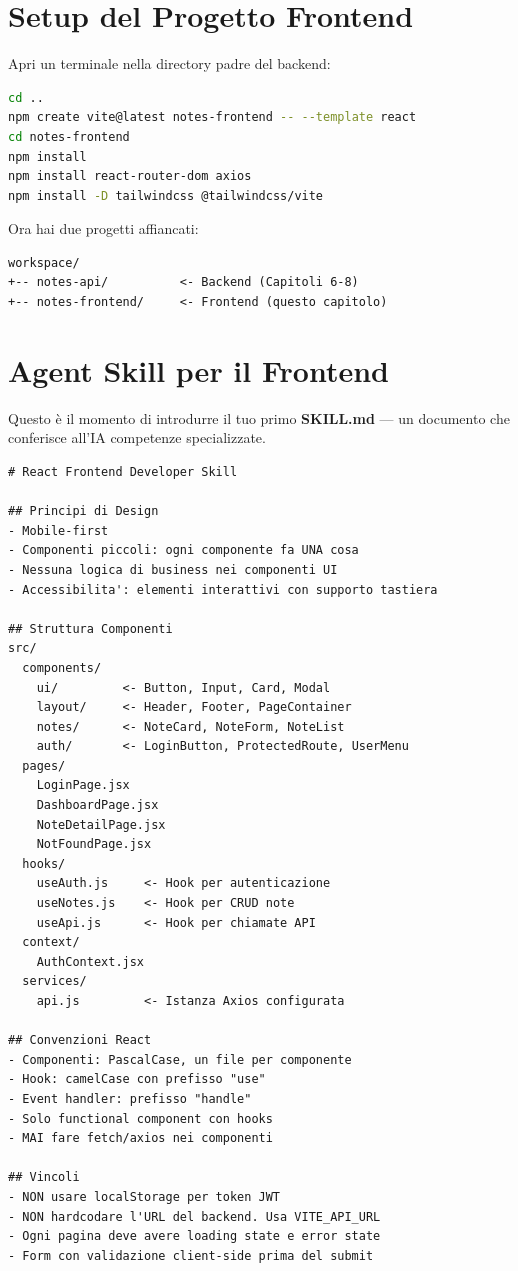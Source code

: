 \section{Setup del Progetto Frontend}

\begin{praticabox}[title={Pratica --- Creare il progetto React}]
Apri un terminale nella directory padre del backend:
\begin{lstlisting}[language=bash]
cd ..
npm create vite@latest notes-frontend -- --template react
cd notes-frontend
npm install
npm install react-router-dom axios
npm install -D tailwindcss @tailwindcss/vite
\end{lstlisting}
Ora hai due progetti affiancati:
\begin{lstlisting}[language={}]
workspace/
+-- notes-api/          <- Backend (Capitoli 6-8)
+-- notes-frontend/     <- Frontend (questo capitolo)
\end{lstlisting}
\end{praticabox}

\section{Agent Skill per il Frontend}

Questo è il momento di introdurre il tuo primo \textbf{SKILL.md} --- un documento che conferisce all'IA competenze specializzate.

\begin{praticabox}[title={Pratica --- Crea il file \texttt{SKILL.md}}]
\end{praticabox}

\begin{lstlisting}[language={},title={\texttt{SKILL.md} --- React Frontend Developer}]
# React Frontend Developer Skill

## Principi di Design
- Mobile-first
- Componenti piccoli: ogni componente fa UNA cosa
- Nessuna logica di business nei componenti UI
- Accessibilita': elementi interattivi con supporto tastiera

## Struttura Componenti
src/
  components/
    ui/         <- Button, Input, Card, Modal
    layout/     <- Header, Footer, PageContainer
    notes/      <- NoteCard, NoteForm, NoteList
    auth/       <- LoginButton, ProtectedRoute, UserMenu
  pages/
    LoginPage.jsx
    DashboardPage.jsx
    NoteDetailPage.jsx
    NotFoundPage.jsx
  hooks/
    useAuth.js     <- Hook per autenticazione
    useNotes.js    <- Hook per CRUD note
    useApi.js      <- Hook per chiamate API
  context/
    AuthContext.jsx
  services/
    api.js         <- Istanza Axios configurata

## Convenzioni React
- Componenti: PascalCase, un file per componente
- Hook: camelCase con prefisso "use"
- Event handler: prefisso "handle"
- Solo functional component con hooks
- MAI fare fetch/axios nei componenti

## Vincoli
- NON usare localStorage per token JWT
- NON hardcodare l'URL del backend. Usa VITE_API_URL
- Ogni pagina deve avere loading state e error state
- Form con validazione client-side prima del submit
\end{lstlisting}

